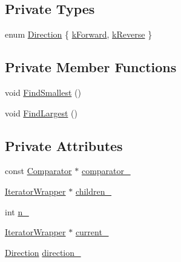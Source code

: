 \subsection*{Private Types}
\begin{DoxyCompactItemize}
\item 
enum \hyperlink{classleveldb_1_1anonymous__namespace_02merger_8cc_03_1_1_merging_iterator_aa82ee25fbe357bdc2a466258951855ae}{Direction} \{ \hyperlink{classleveldb_1_1anonymous__namespace_02merger_8cc_03_1_1_merging_iterator_aa82ee25fbe357bdc2a466258951855aea9d7e653cacb2b641b883e12e3b55eca0}{k\+Forward}, 
\hyperlink{classleveldb_1_1anonymous__namespace_02merger_8cc_03_1_1_merging_iterator_aa82ee25fbe357bdc2a466258951855aeaedb76b393bbe27e9eba1f21ffe96c115}{k\+Reverse}
 \}
\end{DoxyCompactItemize}
\subsection*{Private Member Functions}
\begin{DoxyCompactItemize}
\item 
void \hyperlink{classleveldb_1_1anonymous__namespace_02merger_8cc_03_1_1_merging_iterator_ae377620af9525288bee2d5afc5aa0a5e}{Find\+Smallest} ()
\item 
void \hyperlink{classleveldb_1_1anonymous__namespace_02merger_8cc_03_1_1_merging_iterator_a25b52ddd3fcd6b3601148414ac26a815}{Find\+Largest} ()
\end{DoxyCompactItemize}
\subsection*{Private Attributes}
\begin{DoxyCompactItemize}
\item 
const \hyperlink{structleveldb_1_1_comparator}{Comparator} $\ast$ \hyperlink{classleveldb_1_1anonymous__namespace_02merger_8cc_03_1_1_merging_iterator_ac2c87b1bf54e44400f67a07ebda2bae9}{comparator\+\_\+}
\item 
\hyperlink{classleveldb_1_1_iterator_wrapper}{Iterator\+Wrapper} $\ast$ \hyperlink{classleveldb_1_1anonymous__namespace_02merger_8cc_03_1_1_merging_iterator_a2f90aa0b8aec8d2a7c27a9af7657fe63}{children\+\_\+}
\item 
int \hyperlink{classleveldb_1_1anonymous__namespace_02merger_8cc_03_1_1_merging_iterator_a85e899d8a1f38b5231681b3ad3f11328}{n\+\_\+}
\item 
\hyperlink{classleveldb_1_1_iterator_wrapper}{Iterator\+Wrapper} $\ast$ \hyperlink{classleveldb_1_1anonymous__namespace_02merger_8cc_03_1_1_merging_iterator_a66d5d44bed2cb1e5a16a642529645b9e}{current\+\_\+}
\item 
\hyperlink{classleveldb_1_1anonymous__namespace_02merger_8cc_03_1_1_merging_iterator_aa82ee25fbe357bdc2a466258951855ae}{Direction} \hyperlink{classleveldb_1_1anonymous__namespace_02merger_8cc_03_1_1_merging_iterator_a46e0b476397560b1752bae5ecbba71fd}{direction\+\_\+}
\end{DoxyCompactItemize}
